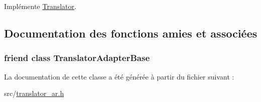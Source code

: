 Implémente \hyperlink{class_translator_a31e719b4e290a359ddbb78132bf3f494}{Translator}.



\subsection{Documentation des fonctions amies et associées}
\hypertarget{class_translator_arabic_a6a27329ec4f8a11907f075e9052d96f7}{}
\subsubsection[{Translator\+Adapter\+Base}]{\setlength{\rightskip}{0pt plus 5cm}friend class {\bf Translator\+Adapter\+Base}\hspace{0.3cm}{\ttfamily [friend]}}\label{class_translator_arabic_a6a27329ec4f8a11907f075e9052d96f7}


La documentation de cette classe a été générée à partir du fichier suivant \+:\begin{DoxyCompactItemize}
\item 
src/\hyperlink{translator__ar_8h}{translator\+\_\+ar.\+h}\end{DoxyCompactItemize}
